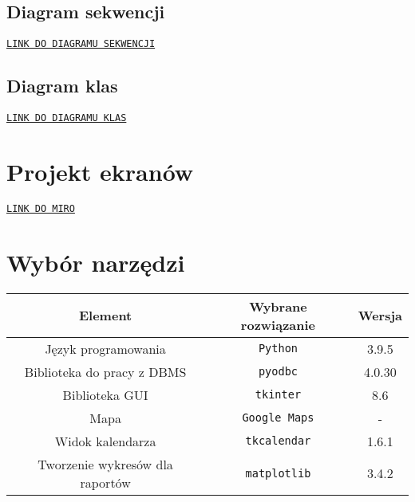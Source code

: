 \documentclass[10pt]{article}
\begin{document}
\pagebreak %

\subsection{Diagram sekwencji}
\texttt{\href{https://drive.google.com/drive/folders/1AHW_von91aril9y62uCa9vJiyDRlB0I8?usp=sharing}{LINK DO DIAGRAMU SEKWENCJI}}

\subsection{Diagram klas}
\texttt{\href{https://miro.com/app/board/o9J_lL81GTA=/}{LINK DO DIAGRAMU KLAS}}

\section{Projekt ekranów}
\texttt{\href{https://miro.com/welcomeonboard/SLn3IxMquzxConVpUMeYinhwTCstNizbIMqoJ5DmRT7SJ334ayztDhFYqNAvMOP7}{LINK DO MIRO}}

\section{Wybór narzędzi}
\begin{table}[h!]
    \begin{center}
        \begin{tabular}{c|c|c}
            Element & Wybrane rozwiązanie & Wersja \\
            \hline
            Język programowania & \texttt{Python} & 3.9.5 \\
            Biblioteka do pracy z DBMS & \texttt{pyodbc} & 4.0.30 \\
            Biblioteka GUI & \texttt{tkinter} & 8.6 \\
            Mapa & \texttt{Google Maps} & - \\
            Widok kalendarza & \texttt{tkcalendar} & 1.6.1 \\
            Tworzenie wykresów dla raportów & \texttt{matplotlib} & 3.4.2
        \end{tabular}
    \end{center}
\end{table}
\end{document}
